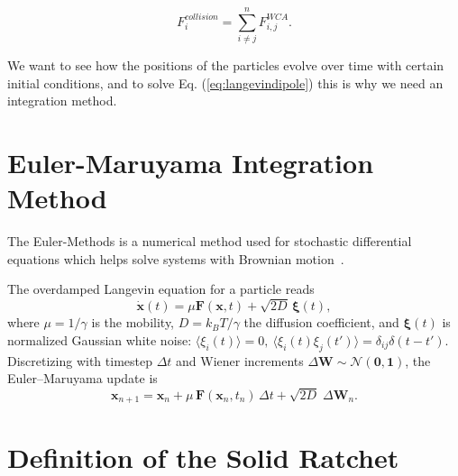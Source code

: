 \begin{equation}
  F^{collision}_i = \sum^{n}_{i \neq j} F^{WCA}_{i,j}.  
  \label{eq:wcasum}
\end{equation}

We want to see how the positions of the particles evolve over time with certain initial conditions, and to solve Eq. (\ref{eq:langevindipole}) this is why we need an integration method.

\section{Euler-Maruyama Integration Method}
The Euler-Methods is a numerical method used for stochastic differential equations which helps solve systems with Brownian motion~\cite{platen2010numerical,higham2001algorithmic}.

The overdamped Langevin equation for a particle reads
\[
\dot{\mathbf x}(t)=\mu\mathbf F(\mathbf x,t)+\sqrt{2D}\,\boldsymbol\xi(t),
\]
where \(\mu=1/\gamma\) is the mobility, \(D=k_BT/\gamma\) the diffusion coefficient,
and \(\boldsymbol\xi(t)\) is normalized Gaussian white noise:
\(\langle\xi_i(t)\rangle=0,\ \langle\xi_i(t)\xi_j(t')\rangle=\delta_{ij}\delta(t-t')\).
Discretizing with timestep \(\Delta t\) and Wiener increments \(\Delta\mathbf W\sim\mathcal N(\mathbf0, \mathbf1)\),
the Euler--Maruyama update is
\begin{equation}
\mathbf x_{n+1} = \mathbf x_n + \mu\,\mathbf F(\mathbf x_n,t_n)\,\Delta t
  + \sqrt{2D}\;\Delta\mathbf W_n.
\label{eq:em_overdamped}
\end{equation}
\section{Definition of the Solid Ratchet}

